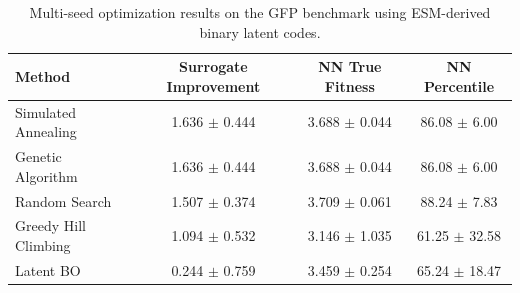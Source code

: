 \begin{table}[t]
\centering
\small
\begin{tabular}{lccc}
\hline
Method & Surrogate Improvement & NN True Fitness & NN Percentile \\
\hline
Simulated Annealing & 1.636 $\pm$ 0.444 & 3.688 $\pm$ 0.044 & 86.08 $\pm$ 6.00 \\
Genetic Algorithm & 1.636 $\pm$ 0.444 & 3.688 $\pm$ 0.044 & 86.08 $\pm$ 6.00 \\
Random Search & 1.507 $\pm$ 0.374 & 3.709 $\pm$ 0.061 & 88.24 $\pm$ 7.83 \\
Greedy Hill Climbing & 1.094 $\pm$ 0.532 & 3.146 $\pm$ 1.035 & 61.25 $\pm$ 32.58 \\
Latent BO & 0.244 $\pm$ 0.759 & 3.459 $\pm$ 0.254 & 65.24 $\pm$ 18.47 \\
\hline
\end{tabular}
\caption{Multi-seed optimization results on the GFP benchmark using ESM-derived binary latent codes.}
\label{tab:gfp_multiseed_results}
\end{table}
